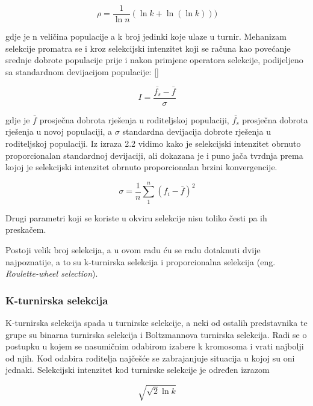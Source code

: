 \documentclass[times, utf8, zavrsni]{fer}
\begin{document}
\begin{equation}
	\rho=\frac{1}{\ln{n}} (\ln{k} + \ln{(\ln{k})})) 
\end{equation}

gdje je n veličina populacije a k broj jedinki koje ulaze u turnir. Mehanizam selekcije promatra se i kroz selekcijski intenzitet koji se računa kao povećanje srednje dobrote populacije prije i nakon primjene operatora selekcije, podijeljeno sa standardnom devijacijom populacije: [\cite{Back1995, MillerAndGoldberg, MuhlenbeinAndVoosen, Thierens}]

\begin{equation}
	\label{izraz}
	I=\frac{\bar{f_s} - \bar{f}}{\sigma}
\end{equation}

gdje je $\bar{f}$ prosječna dobrota rješenja u roditeljskoj populaciji, $\bar{f_s}$ prosječna dobrota rješenja u novoj populaciji, a $\sigma$ standardna devijacija dobrote rješenja u roditeljskoj populaciji. Iz izraza 2.2 vidimo kako je selekcijski intenzitet obrnuto proporcionalan standardnoj devijaciji, ali dokazana je i puno jača tvrdnja prema kojoj je selekcijski intenzitet obrnuto proporcionalan brzini konvergencije. 

\begin{equation}
	\sigma=\frac{1}{n}\sum_{1}^{n}(f_i - \bar{f})^2
\end{equation}


Drugi parametri koji se koriste u okviru selekcije nisu toliko česti pa ih preskačem. 

Postoji velik broj selekcija, a u ovom radu ću se radu dotaknuti dvije najpoznatije, a to su k-turnirska selekcija i proporcionalna selekcija (eng. \emph{Roulette-wheel selection}).

\subsubsection{K-turnirska selekcija}
K-turnirska selekcija spada u turnirske selekcije, a neki od ostalih predstavnika te grupe su binarna turnirska selekcija i Boltzmannova turnirska selekcija.
Radi se o postupku u kojem se nasumičnim odabirom izabere k kromosoma i vrati najbolji od njih. Kod odabira roditelja najčešće se zabrajanjuje situacija u kojoj su oni jednaki. Selekcijski intenzitet kod turnirske selekcije je određen izrazom 

\begin{equation}
	\sqrt{\sqrt{2} \ln{k}}
\end{equation}
\end{document}
